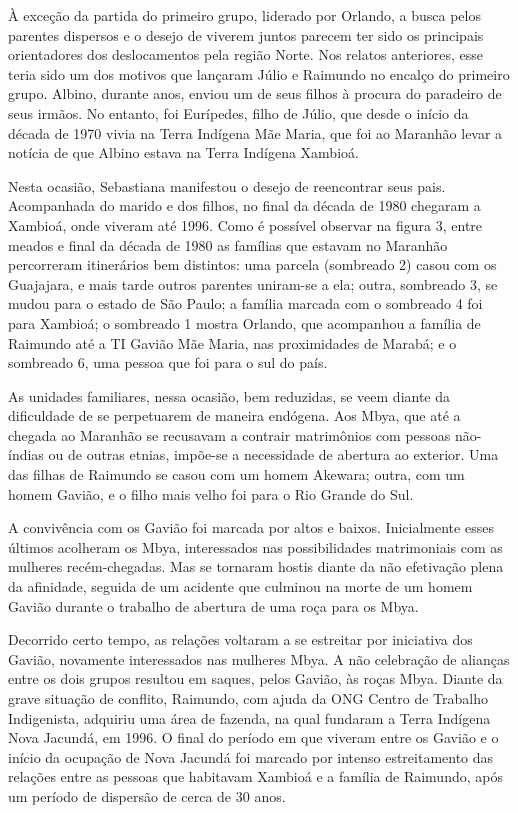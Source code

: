 À exceção da partida do primeiro grupo, liderado por Orlando, a busca
pelos parentes dispersos e o desejo de viverem juntos parecem ter sido
os principais orientadores dos deslocamentos pela região Norte. Nos
relatos anteriores, esse teria sido um dos motivos que lançaram Júlio e
Raimundo no encalço do primeiro grupo. Albino, durante anos, enviou um
de seus filhos à procura do paradeiro de seus irmãos. No entanto, foi
Eurípedes, filho de Júlio, que desde o início da década de 1970 vivia na
Terra Indígena Mãe Maria, que foi ao Maranhão levar a notícia de que
Albino estava na Terra Indígena Xambioá.

Nesta ocasião, Sebastiana manifestou o desejo de reencontrar seus pais.
Acompanhada do marido e dos filhos, no final da década de 1980 chegaram
a Xambioá, onde viveram até 1996. Como é possível observar na figura 3,
entre meados e final da década de 1980 as famílias que estavam no
Maranhão percorreram itinerários bem distintos: uma parcela (sombreado
2) casou com os Guajajara, e mais tarde outros parentes uniram-se a ela; 
outra, sombreado 3, se mudou para o estado de São Paulo; a
família marcada com o sombreado 4 foi para Xambioá; o sombreado 1
mostra Orlando, que acompanhou a família de Raimundo até a TI Gavião
Mãe Maria, nas proximidades de Marabá; e o sombreado 6, uma pessoa que
foi para o sul do país.

As unidades familiares, nessa ocasião, bem reduzidas, se veem diante da
dificuldade de se perpetuarem de maneira endógena. Aos Mbya, que até a
chegada ao Maranhão se recusavam a contrair matrimônios com pessoas
não-índias ou de outras etnias, impõe-se a necessidade de abertura ao
exterior. Uma das filhas de Raimundo se casou com um homem Akewara;
outra, com um homem Gavião, e o filho mais velho foi para o Rio Grande
do Sul. 

A convivência com os Gavião foi marcada por altos e baixos. Inicialmente
esses últimos acolheram os Mbya, interessados nas possibilidades
matrimoniais com as mulheres recém-chegadas. Mas se tornaram hostis
diante da não efetivação plena da afinidade, seguida de um acidente que
culminou na morte de um homem Gavião durante o trabalho de abertura de
uma roça para os Mbya.

Decorrido certo tempo, as relações voltaram a se estreitar por
iniciativa dos Gavião, novamente interessados nas mulheres Mbya. A não
celebração de alianças entre os dois grupos resultou em saques, pelos
Gavião, às roças Mbya. Diante da grave situação de conflito, Raimundo,
com ajuda da ONG Centro de Trabalho Indigenista, adquiriu uma área de
fazenda, na qual fundaram a Terra Indígena Nova Jacundá, em 1996. O
final do período em que viveram entre os Gavião e o início da ocupação
de Nova Jacundá foi marcado por intenso estreitamento das relações
entre as pessoas que habitavam Xambioá e a família de Raimundo, após um
período de dispersão de cerca de 30 anos.

